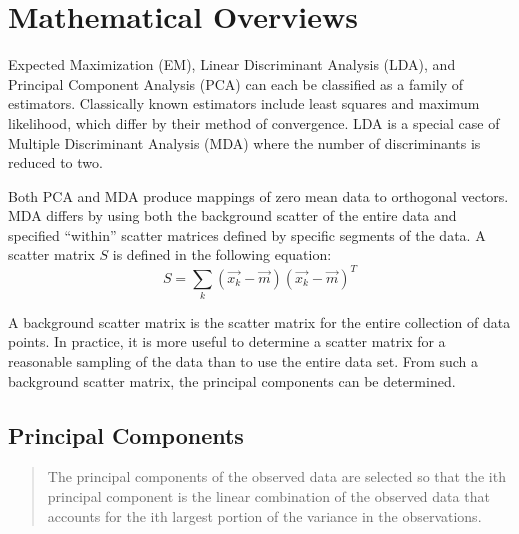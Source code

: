 \documentclass[11pt]{article}
\begin{document}
\section{Mathematical Overviews}\label{math-overview-section}
Expected Maximization (EM), Linear Discriminant Analysis (LDA), and Principal Component Analysis (PCA) can each be classified as a family of estimators.  Classically known estimators %
include  least squares and maximum likelihood, %
 which
differ by their method of convergence.  LDA is a special case of Multiple Discriminant Analysis  (MDA) where the number of discriminants is reduced to two.  

\newpage
Both PCA and MDA produce mappings of zero mean data to orthogonal vectors.   MDA differs by using both the background scatter of the entire data  and specified ``within'' scatter matrices defined by specific segments of the data.  A scatter matrix $S$ is defined in the following equation: %
\begin{equation}
	S = \sum _k (\vec{x_k} - \vec{m})(\vec{x_k} - \vec{m})^T \label{typical-scatter} 
\end{equation}

A background scatter matrix is the scatter matrix for the entire collection of data points.  In practice, it is more useful to determine a scatter matrix for a reasonable sampling of the data than to use the entire data set.   From such a background scatter matrix, the principal components can be determined.

\subsection{Principal Components}\label{pca-sub-section}

\begin{quote}
	The principal components of the observed data are selected so that the ith principal component is the linear combination of the observed data that accounts for the ith largest portion of the variance in the observations.
\cite[329]{moon-stirling-book}
\end{quote}
\end{document}
